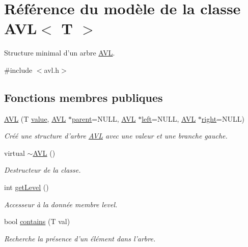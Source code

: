 \hypertarget{class_a_v_l}{\section{Référence du modèle de la classe A\-V\-L$<$ T $>$}
\label{class_a_v_l}
}


Structure minimal d'un arbre \hyperlink{class_a_v_l}{A\-V\-L}.  




{\ttfamily \#include $<$avl.\-h$>$}

\subsection*{Fonctions membres publiques}
\begin{DoxyCompactItemize}
\item 
\hyperlink{class_a_v_l_abbcd7c80b69cdf8caab9ea79b51163d9}{A\-V\-L} (T \hyperlink{class_a_v_l_a3f5c40790a92e0ebd93a187812d6b698}{value}, \hyperlink{class_a_v_l}{A\-V\-L} $\ast$\hyperlink{class_a_v_l_a3978c23794aa5e11eb37473e1cebe4e5}{parent}=N\-U\-L\-L, \hyperlink{class_a_v_l}{A\-V\-L} $\ast$\hyperlink{class_a_v_l_aa1ea6df15798ce98461729e2b1deeb87}{left}=N\-U\-L\-L, \hyperlink{class_a_v_l}{A\-V\-L} $\ast$\hyperlink{class_a_v_l_ac02dee89f769588763a80be6176af37b}{right}=N\-U\-L\-L)
\begin{DoxyCompactList}\small\item\em Créé une structure d'arbre \hyperlink{class_a_v_l}{A\-V\-L} avec une valeur et une branche gauche. \end{DoxyCompactList}\item 
virtual \hyperlink{class_a_v_l_a07d2694a7bb1f26f9990f01acf29c5af}{$\sim$\-A\-V\-L} ()
\begin{DoxyCompactList}\small\item\em Destructeur de la classe. \end{DoxyCompactList}\item 
int \hyperlink{class_a_v_l_a2c7b07714a761de62798b87856d5827a}{get\-Level} ()
\begin{DoxyCompactList}\small\item\em Accesseur à la donnée membre level. \end{DoxyCompactList}\item 
bool \hyperlink{class_a_v_l_a1d9cd2afeb001a6a4fc9f90964d66b0d}{contains} (T val)
\begin{DoxyCompactList}\small\item\em Recherche la présence d'un élément dans l'arbre. \end{DoxyCompactList}\item 

\end{DoxyCompactItemize}
